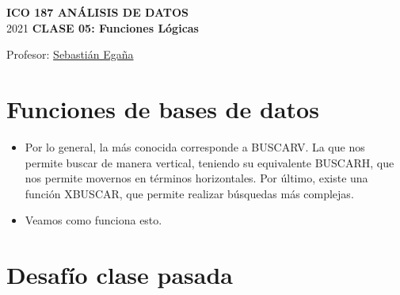 \documentclass[12 pt,letterpaper]{article}
\begin{document}
%

	
	\pagestyle{fancy}
	\fancyhf{}
	\renewcommand{\headrulewidth}{0pt}
	\renewcommand{\footrulewidth}{0pt}	
	
\begin{center}
		
	\bigbreak
	\textbf{ICO 187 ANÁLISIS DE DATOS}\\
	\small{2021}
	\break
	\textbf{CLASE 05: Funciones Lógicas}\\
\end{center}

\begin{flushright}	
		
	Profesor: \href{mailto:sebastianeganasa@santotomas.cl}{Sebastián Egaña}

\end{flushright}

\section{Funciones de bases de datos}

\begin{itemize}
	\item Por lo general, la más conocida corresponde a BUSCARV. La que nos permite buscar de manera vertical, teniendo su equivalente BUSCARH, que nos permite movernos en términos horizontales. Por último, existe una función XBUSCAR, que permite realizar búsquedas más complejas.

	\item Veamos como funciona esto. 	
\end{itemize}
	
\section{Desafío clase pasada \faWarning}
\end{document}

